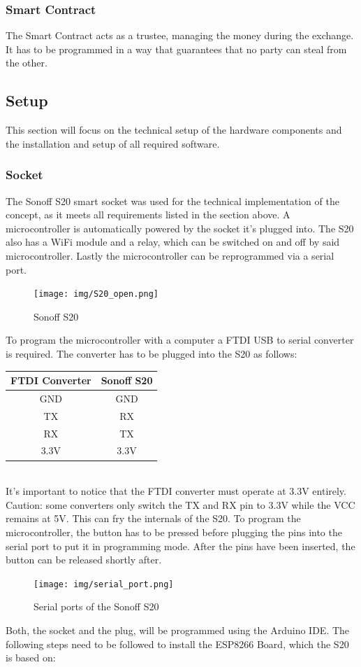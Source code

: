 \subsubsection{Smart Contract}
The Smart Contract acts as a trustee, managing the money during the exchange. It has to be programmed in a way that guarantees that no party can steal from the other.

\newpage
\subsection{Setup}
This section will focus on the technical setup of the hardware components and the installation and setup of all required software.
\\
\subsubsection{Socket}
The Sonoff S20 smart socket was used for the technical implementation of the concept, as it meets all requirements listed in the section above. A microcontroller is automatically powered by the socket it’s plugged into. The S20 also has a WiFi module and a relay, which can be switched on and off by said microcontroller. Lastly the microcontroller can be reprogrammed via a serial port.
\\
\begin{figure}[h]
    \texttt{[image: img/S20\_open.png]}
    \caption{Sonoff S20}
    \label{fig:S20}
\end{figure}
\newpage
To program the microcontroller with a computer a FTDI USB to serial converter is required. The converter has to be plugged into the S20 as follows:
\\
\begin{center}
    \begin{tabular} { |c|c| }
        \hline
        FTDI Converter & Sonoff S20 \\
        \hline\hline
        GND & GND \\
        \hline
        TX & RX \\
        \hline
        RX & TX \\
        \hline
        3.3V & 3.3V \\
        \hline
    \end{tabular}
\end{center}
\leavevmode
\\
It's important to notice that the FTDI converter must operate at 3.3V entirely. Caution: some converters only switch the TX and RX pin to 3.3V while the VCC remains at 5V. This can fry the internals of the S20. To program the microcontroller, the button has to be pressed before plugging the pins into the serial port to put it in programming mode. After the pins have been inserted, the button can be released shortly after.
\\
\begin{figure}[h]
    \texttt{[image: img/serial\_port.png]}
    \caption{Serial ports of the Sonoff S20}
    \label{fig:S20_serial}
\end{figure}
\newpage
Both, the socket and the plug, will be programmed using the Arduino IDE. The following steps need to be followed to install the ESP8266 Board, which the S20 is based on:

